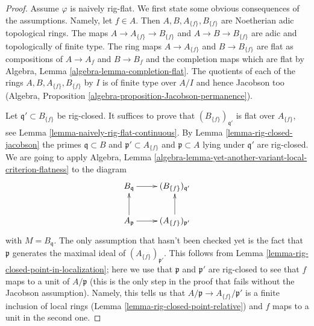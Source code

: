 \documentclass[10pt,a4paper]{amsart}
\theoremstyle{plain}
\theoremstyle{definition}
\theoremstyle{remark}
\numberwithin{equation}{subsection}
\begin{document}
\begin{proof}
Assume $\varphi$ is naively rig-flat. We first state some obvious
consequences of the assumptions. Namely, let $f \in A$.
Then $A, B, A_{\{f\}}, B_{\{f\}}$
are Noetherian adic topological rings. The maps
$A \to A_{\{f\}} \to B_{\{f\}}$ and $A \to B \to B_{\{f\}}$
are adic and topologically of finite type.
The ring maps $A \to A_{\{f\}}$ and $B \to B_{\{f\}}$
are flat as compositions of $A \to A_f$ and $B \to B_f$
and the completion maps which are flat by
Algebra, Lemma \ref{algebra-lemma-completion-flat}.
The quotients of each of the rings
$A, B, A_{\{f\}}, B_{\{f\}}$ by $I$ is of finite type
over $A/I$ and hence Jacobson too
(Algebra, Proposition \ref{algebra-proposition-Jacobson-permanence}).

\medskip\noindent
Let $\mathfrak q' \subset B_{\{f\}}$ be rig-closed.
It suffices to prove that $(B_{\{f\}})_{\mathfrak q'}$
is flat over $A_{\{f\}}$, see Lemma \ref{lemma-naively-rig-flat-continuous}.
By Lemma \ref{lemma-rig-closed-jacobson} the primes
$\mathfrak q \subset B$ and $\mathfrak p' \subset A_{\{f\}}$
and $\mathfrak p \subset A$ lying under $\mathfrak q'$ are rig-closed.
We are going to apply
Algebra, Lemma \ref{algebra-lemma-yet-another-variant-local-criterion-flatness}
to the diagram
$$
\xymatrix{
B_\mathfrak q \ar[r] &
(B_{\{f\}})_{\mathfrak q'} \\
A_\mathfrak p \ar[u] \ar[r] &
(A_{\{f\}})_{\mathfrak p'} \ar[u]
}
$$
with $M = B_\mathfrak q$.
The only assumption that hasn't been checked yet is the fact
that $\mathfrak p$ generates the maximal ideal of
$(A_{\{f\}})_{\mathfrak p'}$. This follows from
Lemma \ref{lemma-rig-closed-point-in-localization};
here we use that $\mathfrak p$ and $\mathfrak p'$ are rig-closed
to see that $f$ maps to a unit of $A/\mathfrak p$
(this is the only step in the proof that fails without
the Jacobson assumption). Namely,
this tells us that $A/\mathfrak p \to A_{\{f\}}/\mathfrak p'$
is a finite inclusion of local rings
(Lemma \ref{lemma-rig-closed-point-relative})
and $f$ maps to a unit in the second one.
\end{proof}
\end{document}
